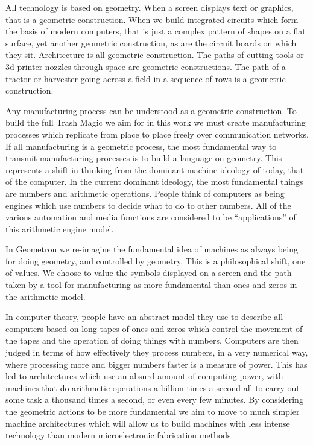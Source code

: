 
All technology is based on geometry. When a screen displays text or
graphics, that is a geometric construction. When we build integrated
circuits which form the basis of modern computers, that is just a
complex pattern of shapes on a flat surface, yet another geometric
construction, as are the circuit boards on which they sit. Architecture
is all geometric construction. The paths of cutting tools or 3d printer
nozzles through space are geometric constructions. The path of a tractor
or harvester going across a field in a sequence of rows is a geometric
construction.

Any manufacturing process can be understood as a geometric construction.
To build the full Trash Magic we aim for in this work we must create
manufacturing processes which replicate from place to place freely over
communication networks. If all manufacturing is a geometric process, the
most fundamental way to transmit manufacturing processes is to build a
language on geometry. This represents a shift in thinking from the
dominant machine ideology of today, that of the computer. In the current
dominant ideology, the most fundamental things are numbers and
arithmetic operations. People think of computers as being engines which
use numbers to decide what to do to other numbers. All of the various
automation and media functions are considered to be ``applications'' of
this arithmetic engine model.

In Geometron we re-imagine the fundamental idea of machines as always
being for doing geometry, and controlled by geometry. This is a
philosophical shift, one of values. We choose to value the symbols
displayed on a screen and the path taken by a tool for manufacturing as
more fundamental than ones and zeros in the arithmetic model.

In computer theory, people have an abstract model they use to describe
all computers based on long tapes of ones and zeros which control the
movement of the tapes and the operation of doing things with numbers.
Computers are then judged in terms of how effectively they process
numbers, in a very numerical way, where processing more and bigger
numbers faster is a measure of power. This has led to architectures
which use an absurd amount of computing power, with machines that do
arithmetic operations a billion times a second all to carry out some
task a thousand times a second, or even every few minutes. By
considering the geometric actions to be more fundamental we aim to move
to much simpler machine architectures which will allow us to build
machines with less intense technology than modern microelectronic
fabrication methods.

